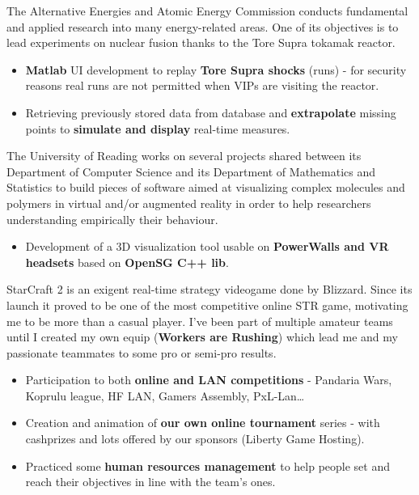 \documentclass[10pt, a4paper, ragged2e]{altacv}
\begin{document}
		
		The Alternative Energies and Atomic Energy Commission conducts fundamental and applied research into many energy-related areas. One of its objectives is to lead experiments on nuclear fusion thanks to the Tore Supra tokamak reactor.
		
		\medskip
		\begin{itemize}
			\item \textbf{Matlab} UI development to replay \textbf{Tore Supra shocks} (runs) - for security reasons real runs are not permitted when VIPs are visiting the reactor.
			\item Retrieving previously stored data from database and \textbf{extrapolate} missing points to \textbf{simulate and display} real-time measures.
		\end{itemize}
	\divider

		
		The University of Reading works on several projects shared between its Department of Computer Science and its Department of Mathematics and Statistics to build pieces of software aimed at visualizing complex molecules and polymers in virtual and/or augmented reality in order to help researchers understanding empirically their behaviour. 
		
		\medskip
		\begin{itemize}
			\item Development of a 3D visualization tool usable on \textbf{PowerWalls and VR headsets} based on \textbf{OpenSG C++ lib}.
		\end{itemize}

\bigskip
{}
	
		StarCraft 2 is an exigent real-time strategy videogame done by Blizzard. Since its launch it proved to be one of the most competitive online STR game, motivating me to be more than a casual player. I've been part of multiple amateur teams until I created my own equip (\textbf{Workers are Rushing}) which lead me and my passionate teammates to some pro or semi-pro results.

		\medskip
		\begin{itemize}
			\item Participation to both \textbf{online and LAN competitions} - Pandaria Wars, Koprulu league, HF LAN, Gamers Assembly, PxL-Lan\ldots
			\item Creation and animation of \textbf{our own online tournament} series - with cashprizes and lots offered by our sponsors (Liberty Game Hosting).
			\item Practiced some \textbf{human resources management} to help people set and reach their objectives in line with the team's ones.
		\end{itemize}
	\divider
\end{document}
